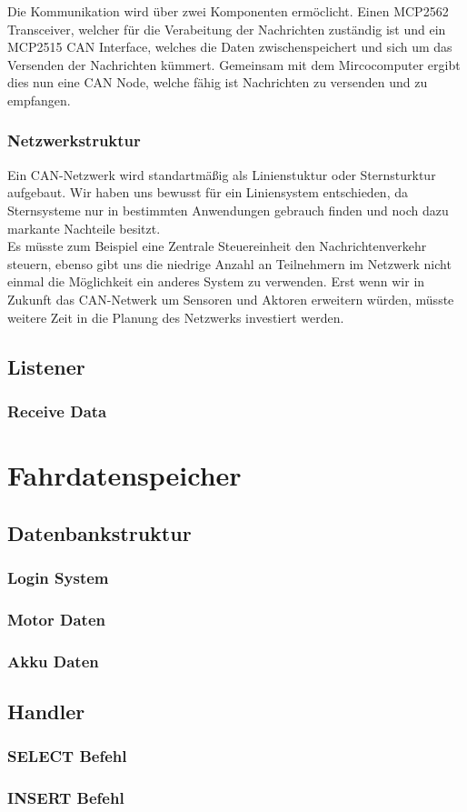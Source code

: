 Die Kommunikation wird über zwei Komponenten ermöclicht. Einen MCP2562 Transceiver, welcher für die Verabeitung der Nachrichten zuständig ist und ein MCP2515 CAN Interface, welches die Daten zwischenspeichert und sich um das Versenden der Nachrichten kümmert. Gemeinsam mit dem Mircocomputer ergibt dies nun eine CAN Node, welche fähig ist Nachrichten zu versenden und zu empfangen.

\subsubsection{Netzwerkstruktur}

Ein CAN-Netzwerk wird standartmäßig als Linienstuktur oder Sternsturktur aufgebaut. Wir haben uns bewusst für ein Liniensystem entschieden, da Sternsysteme nur in bestimmten Anwendungen gebrauch finden und noch dazu markante Nachteile besitzt.\\ Es müsste zum Beispiel eine Zentrale Steuereinheit den Nachrichtenverkehr steuern, ebenso gibt uns die niedrige Anzahl an Teilnehmern im Netzwerk nicht einmal die Möglichkeit ein anderes System zu verwenden. Erst wenn wir in Zukunft das CAN-Netwerk um Sensoren und Aktoren erweitern würden, müsste weitere Zeit in die Planung des Netzwerks investiert werden. 

\newpage

\subsection{Listener}
\subsubsection{Receive Data}

\newpage


\section{Fahrdatenspeicher}
\subsection{Datenbankstruktur}
\subsubsection{Login System}
\subsubsection{Motor Daten}
\subsubsection{Akku Daten}
\subsection{Handler}
\subsubsection{SELECT Befehl}
\subsubsection{INSERT Befehl}

\newpage